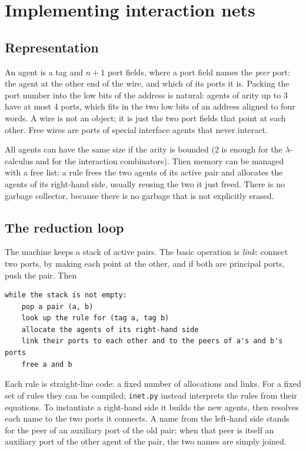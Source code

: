 \documentclass[11pt,a4paper]{article}
\theoremstyle{definition}
\theoremstyle{plain}
\begin{document}
\section{Implementing interaction nets}\label{sec:implementation}

\subsection{Representation}

An agent is a tag and $n+1$ port fields, where a port field names the
\emph{peer} port: the agent at the other end of the wire, and which of its
ports it is. Packing the port number into the low bits of the address is
natural: agents of arity up to 3 have at most 4 ports, which fits in the two
low bits of an address aligned to four words. A wire is not an object; it is
just the two port fields that point at each other. Free wires are ports of
special interface agents that never interact.

All agents can have the same size if the arity is bounded (2 is enough for
the $\lambda$-calculus and for the interaction combinators). Then memory can
be managed with a free list: a rule frees the two agents of its active pair
and allocates the agents of its right-hand side, usually reusing the two it
just freed. There is no garbage collector, because there is no garbage that
is not explicitly erased.

\subsection{The reduction loop}

The machine keeps a stack of active pairs. The basic operation is
\emph{link}: connect two ports, by making each point at the other, and if
both are principal ports, push the pair. Then
\begin{lstlisting}[style=plain]
while the stack is not empty:
    pop a pair (a, b)
    look up the rule for (tag a, tag b)
    allocate the agents of its right-hand side
    link their ports to each other and to the peers of a's and b's ports
    free a and b
\end{lstlisting}
Each rule is straight-line code: a fixed number of allocations and links. For
a fixed set of rules they can be compiled; \texttt{inet.py} instead
interprets the rules from their equations. To instantiate a right-hand side it
builds the new agents, then resolves each name to the two ports it connects.
A name from the left-hand side stands for the peer of an auxiliary port of the
old pair; when that peer is itself an auxiliary port of the other agent of
the pair, the two names are simply joined.
\end{document}
